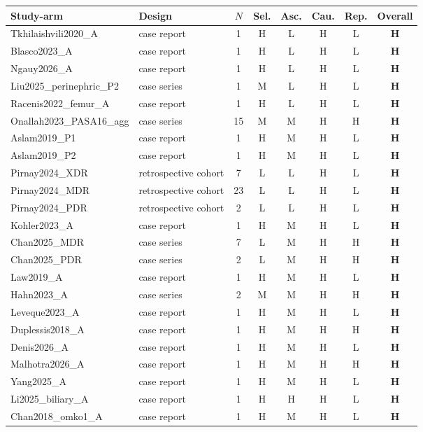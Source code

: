 \begin{tabular}{llcccccc}
\toprule
Study-arm & Design & $N$ & Sel. & Asc. & Cau. & Rep. & Overall \\
\midrule
Tkhilaishvili2020\_A & case report & 1 & H & L & H & L & \textbf{H} \\
Blasco2023\_A & case report & 1 & H & L & H & L & \textbf{H} \\
Ngauy2026\_A & case report & 1 & H & L & H & L & \textbf{H} \\
Liu2025\_perinephric\_P2 & case series & 1 & M & L & H & L & \textbf{H} \\
Racenis2022\_femur\_A & case report & 1 & H & L & H & L & \textbf{H} \\
Onallah2023\_PASA16\_agg & case series & 15 & M & M & H & H & \textbf{H} \\
Aslam2019\_P1 & case report & 1 & H & M & H & L & \textbf{H} \\
Aslam2019\_P2 & case report & 1 & H & M & H & L & \textbf{H} \\
Pirnay2024\_XDR & retrospective cohort & 7 & L & L & H & L & \textbf{H} \\
Pirnay2024\_MDR & retrospective cohort & 23 & L & L & H & L & \textbf{H} \\
Pirnay2024\_PDR & retrospective cohort & 2 & L & L & H & L & \textbf{H} \\
Kohler2023\_A & case report & 1 & H & M & H & L & \textbf{H} \\
Chan2025\_MDR & case series & 7 & L & M & H & H & \textbf{H} \\
Chan2025\_PDR & case series & 2 & L & M & H & H & \textbf{H} \\
Law2019\_A & case report & 1 & H & M & H & L & \textbf{H} \\
Hahn2023\_A & case series & 2 & M & M & H & H & \textbf{H} \\
Leveque2023\_A & case report & 1 & H & M & H & L & \textbf{H} \\
Duplessis2018\_A & case report & 1 & H & M & H & H & \textbf{H} \\
Denis2026\_A & case report & 1 & H & M & H & L & \textbf{H} \\
Malhotra2026\_A & case report & 1 & H & M & H & H & \textbf{H} \\
Yang2025\_A & case report & 1 & H & M & H & L & \textbf{H} \\
Li2025\_biliary\_A & case report & 1 & H & H & H & L & \textbf{H} \\
Chan2018\_omko1\_A & case report & 1 & H & M & H & L & \textbf{H} \\

\end{tabular}
